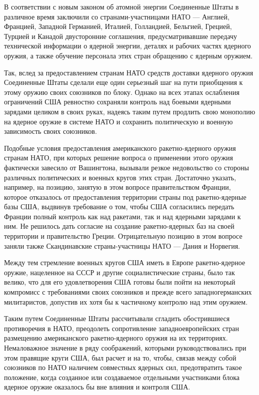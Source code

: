 \documentclass[12pt, a4paper, openany]{book}
\begin{document}
	В соответствии с новым законом об атомной энергии Соединенные Штаты в различное время заключили со странами-участницами НАТО — Англией, Францией, Западной Германией, Италией, Голландией, Бельгией, Грецией, Турцией и Канадой двусторонние соглашения, предусматривавшие передачу технической информации о ядерной энергии, деталях и рабочих частях ядерного оружия, а также обучение персонала этих стран обращению с ядерным оружием.
	
	Так, вслед за предоставлением странам НАТО средств доставки ядерного оружия Соединенные Штаты сделали еще один серьезный шаг на пути приобщения к этому оружию своих союзников по блоку. Однако на всех этапах ослабления ограничений США ревностно сохраняли контроль над боевыми ядерными зарядами целиком в своих руках, надеясь таким путем продлить свою монополию на ядерное оружие в системе НАТО и сохранить политическую и военную зависимость своих союзников.
	
	Подобные условия предоставления американского ракетно-ядерного оружия странам НАТО, при которых решение вопроса о применении этого оружия фактически завесило от Вашингтона, вызывали резкое недовольство со стороны различных политических и военных кругов этих стран. Достаточно указать, например, на позицию, занятую в этом вопросе правительством Франции, которое отказалось от предоставления территории страны под ракетно-ядерные базы США, выдвинув требование о том, чтобы США согласились передать Франции полный контроль как над ракетами, так и над ядерными зарядами к ним. Не решилось дать согласие на создание ракетно-ядерных баз на своей территории и правительство Греции. Отрицательную позицию в этом вопросе заняли также Скандинавские страны-участницы НАТО — Дания и Норвегия.
	
	Между тем стремление военных кругов США иметь в Европе ракетно-ядерное оружие, нацеленное на СССР и другие социалистические страны, было так велико, что для его удовлетворения США готовы были пойти на некоторый компромисс с требованиями своих союзников и прежде всего западногерманских милитаристов, допустив их хотя бы к частичному контролю над этим оружием.
	
	Таким путем Соединенные Штаты рассчитывали сгладить обострившиеся противоречия в НАТО, преодолеть сопротивление западноевропейских стран размещению американского ракетно-ядерного оружия на их территориях. Немаловажное значение в ряду соображений, которыми руководствовались при этом правящие круги США, был расчет и на то, чтобы, связав между собой союзников по НАТО наличием совместных ядерных сил, предотвратить такое положение, когда созданное или создаваемое отдельными участниками блока ядерное оружие оказалось бы вне влияния и контроля США.
	
\end{document}
